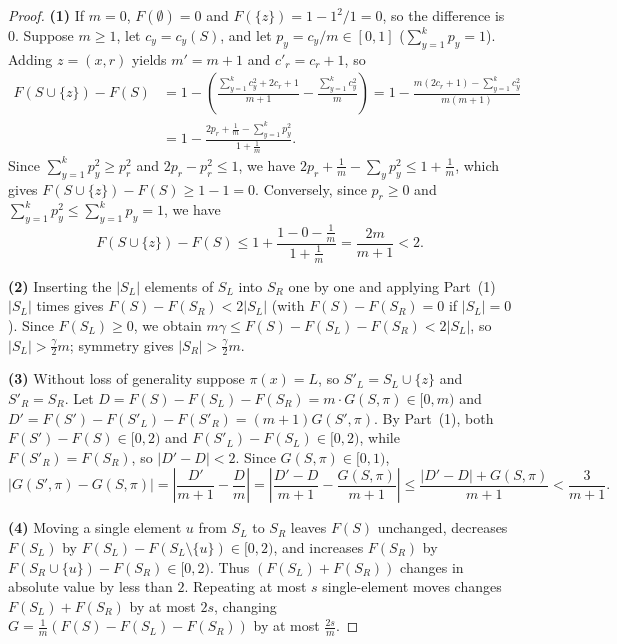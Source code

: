 \documentclass[11pt]{article}
\theoremstyle{definition}
\begin{document}
\begin{proof}
\textbf{(1)} If $m = 0$, $F(\emptyset) = 0$ and $F(\{z\}) = 1 - 1^2/1 = 0$, so the difference is $0$. Suppose $m \ge 1$, let $c_y = c_y(S)$, and let $p_y = c_y / m \in [0, 1]$ ($\sum_{y=1}^k p_y = 1$). Adding $z = (x, r)$ yields $m' = m+1$ and $c'_r = c_r + 1$, so
\begin{align*}
    F(S \cup \{z\}) - F(S) &= 1 - \left(\frac{\sum_{y=1}^k c_y^2 + 2 c_r + 1}{m + 1} - \frac{\sum_{y=1}^k c_y^2}{m}\right)
    = 1 - \frac{m(2c_r + 1) - \sum_{y=1}^k c_y^2}{m(m+1)} \\
    &= 1 - \frac{2p_r + \frac{1}{m} - \sum_{y=1}^k p_y^2}{1 + \frac{1}{m}}.
\end{align*}
Since $\sum_{y=1}^k p_y^2 \ge p_r^2$ and $2p_r - p_r^2 \le 1$, we have $2p_r + \frac{1}{m} - \sum_y p_y^2 \le 1 + \frac{1}{m}$, which gives $F(S \cup \{z\}) - F(S) \ge 1 - 1 = 0$. Conversely, since $p_r \ge 0$ and $\sum_{y=1}^k p_y^2 \le \sum_{y=1}^k p_y = 1$, we have
\[
    F(S \cup \{z\}) - F(S) \le 1 + \frac{1 - 0 - \frac{1}{m}}{1 + \frac{1}{m}} = \frac{2m}{m + 1} < 2.
\]

\textbf{(2)} Inserting the $|S_L|$ elements of $S_L$ into $S_R$ one by one and applying Part~(1) $|S_L|$ times gives $F(S) - F(S_R) < 2|S_L|$ (with $F(S) - F(S_R) = 0$ if $|S_L| = 0$). Since $F(S_L) \ge 0$, we obtain $m \gamma \le F(S) - F(S_L) - F(S_R) < 2|S_L|$, so $|S_L| > \frac{\gamma}{2}m$; symmetry gives $|S_R| > \frac{\gamma}{2}m$.

\textbf{(3)} Without loss of generality suppose $\pi(x) = L$, so $S'_L = S_L \cup \{z\}$ and $S'_R = S_R$. Let $D = F(S) - F(S_L) - F(S_R) = m \cdot G(S, \pi) \in [0, m)$ and $D' = F(S') - F(S'_L) - F(S'_R) = (m+1) G(S', \pi)$. By Part~(1), both $F(S') - F(S) \in [0, 2)$ and $F(S'_L) - F(S_L) \in [0, 2)$, while $F(S'_R) = F(S_R)$, so $|D' - D| < 2$. Since $G(S, \pi) \in [0, 1)$,
\[
    \big|G(S', \pi) - G(S, \pi)\big| = \left|\frac{D'}{m+1} - \frac{D}{m}\right| = \left|\frac{D' - D}{m+1} - \frac{G(S, \pi)}{m+1}\right| \le \frac{|D' - D| + G(S, \pi)}{m + 1} < \frac{3}{m + 1}.
\]

\textbf{(4)} Moving a single element $u$ from $S_L$ to $S_R$ leaves $F(S)$ unchanged, decreases $F(S_L)$ by $F(S_L) - F(S_L \setminus \{u\}) \in [0, 2)$, and increases $F(S_R)$ by $F(S_R \cup \{u\}) - F(S_R) \in [0, 2)$. Thus $(F(S_L) + F(S_R))$ changes in absolute value by less than $2$. Repeating at most $s$ single-element moves changes $F(S_L) + F(S_R)$ by at most $2s$, changing $G = \frac{1}{m}(F(S) - F(S_L) - F(S_R))$ by at most $\frac{2s}{m}$.
\end{proof}
\end{document}
